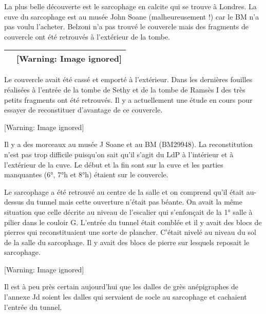 \documentclass{article}
\begin{document}
La plus belle découverte est le sarcophage en calcite qui se trouve à
Londres.  La cuve du sarcophage est au musée John Soane
(malheureusement !) car le BM n’a pas voulu l’acheter. Belzoni n’a pas
trouvé le couvercle mais des fragments de couvercle ont été retrouvés à
l’extérieur de la tombe. 

\begin{flushleft}
\tablehead{}
\begin{supertabular}{|l|l|}
  &   [Warning: Image ignored] %
 \\\hline
\end{supertabular}
\end{flushleft}
Le couvercle avait été cassé et emporté à l’extérieur. Dans les
dernières fouilles réalisées à l’entrée de la tombe de Sethy et de la
tombe de Ramsès I des très petits fragments ont été retrouvés. Il y a
actuellement une étude en cours pour essayer de reconstituer d’avantage
de ce couvercle. 

  [Warning: Image ignored] %
 

Il y a des morceaux au musée J Soane et au BM (BM29948). La
reconstitution n’est pas trop difficile puisqu’on sait qu’il s’agit du
LdP à l’intérieur et à l’extérieur de la cuve. Le début et la fin sont
sur la cuve et les parties manquantes (6°, 7°h et 8°h) étaient sur le
couvercle. 

Le sarcophage a été retrouvé au centre de la salle et on comprend qu’il
était au-dessus du tunnel mais cette ouverture n’était pas béante. On
avait la même situation que celle décrite au niveau de l’escalier qui
s’enfonçait de la 1° salle à pilier dans le couloir G. L’entrée du
tunnel était comblée et il y avait des blocs de pierres qui
reconstituaient une sorte de plancher. C’était nivelé au niveau du sol
de la salle du sarcophage. Il y avait des blocs de pierre sur lesquels
reposait le sarcophage.

  [Warning: Image ignored] %
 

Il est à peu près certain aujourd’hui que les dalles de grès
anépigraphes de l’annexe Jd soient les dalles qui servaient de socle au
sarcophage et cachaient l’entrée du tunnel.
\end{document}
